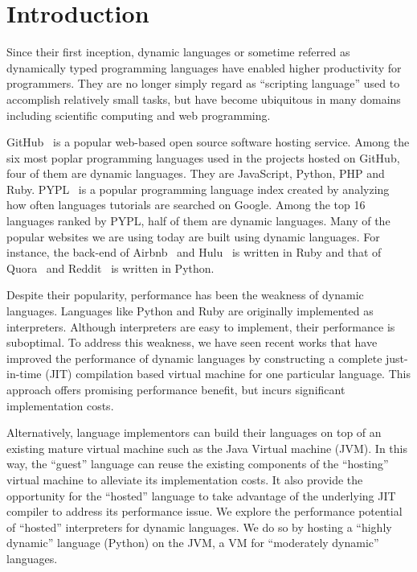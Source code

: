 \chapter{Introduction}
\label{chp:ch1-intro}

Since their first inception, dynamic languages or sometime referred as dynamically typed programming languages have enabled higher productivity for programmers.
They are no longer simply regard as ``scripting language'' used to accomplish relatively small tasks,
but have become ubiquitous in many domains including scientific computing and web programming.

GitHub~\cite{github} is a popular web-based open source software hosting service.
Among the six most poplar programming languages used in the projects hosted on GitHub, four of them are dynamic languages.
They are JavaScript, Python, PHP and Ruby.
PYPL~\cite{pypl} is a popular programming language index created by analyzing how often languages tutorials are searched on Google.
Among the top 16 languages ranked by PYPL, half of them are dynamic languages.
Many of the popular websites we are using today are built using dynamic languages.
For instance, the back-end of Airbnb~\cite{airbnb} and Hulu~\cite{hulu} is written in Ruby and that of Quora~\cite{quora} and Reddit~\cite{reddit} is written in Python.

Despite their popularity, performance has been the weakness of dynamic languages.
Languages like Python and Ruby are originally implemented as interpreters.
Although interpreters are easy to implement, their performance is suboptimal.
To address this weakness, we have seen recent works that have improved the performance of dynamic languages
by constructing a complete just-in-time (JIT) compilation based virtual machine for one particular language.
This approach offers promising performance benefit, but incurs significant implementation costs.

Alternatively, language implementors can build their languages on top of an existing mature virtual machine such as the Java Virtual machine (JVM).
In this way, the ``guest'' language can reuse the existing components of the ``hosting'' virtual machine to alleviate its implementation costs.
It also provide the opportunity for the ``hosted'' language to take advantage of the underlying JIT compiler to address its performance issue.
We explore the performance potential of ``hosted'' interpreters for dynamic languages.
We do so by hosting a ``highly dynamic'' language (Python) on the JVM, a VM for ``moderately dynamic'' languages.

